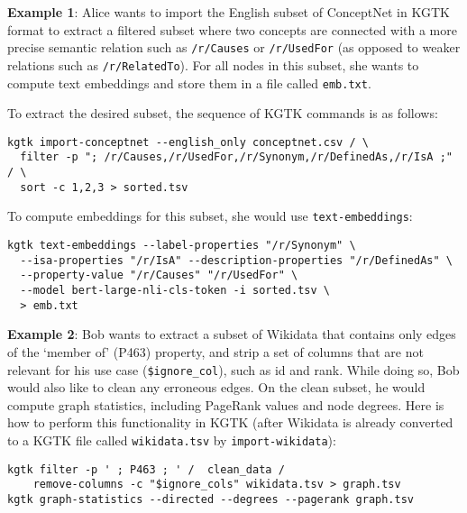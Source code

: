\documentclass[runningheads]{llncs}
\begin{document}



\textbf{Example 1}: Alice wants to import the English subset of ConceptNet \cite{speer2016conceptnet} in KGTK format to extract a filtered subset where two concepts are connected with a more precise semantic relation such as \texttt{/r/Causes} or \texttt{/r/UsedFor} (as opposed to weaker relations such as \texttt{/r/RelatedTo}). For all nodes in this subset, she wants to compute text embeddings and store them in a file called \texttt{emb.txt}.

To extract the desired subset, the sequence of KGTK commands is as follows:
{\footnotesize
\begin{verbatim}
kgtk import-conceptnet --english_only conceptnet.csv / \
  filter -p "; /r/Causes,/r/UsedFor,/r/Synonym,/r/DefinedAs,/r/IsA ;" / \
  sort -c 1,2,3 > sorted.tsv
\end{verbatim}
}

To compute embeddings for this subset, she would use \texttt{text-embeddings}:
{\footnotesize
\begin{verbatim}
kgtk text-embeddings --label-properties "/r/Synonym" \
  --isa-properties "/r/IsA" --description-properties "/r/DefinedAs" \
  --property-value "/r/Causes" "/r/UsedFor" \ 
  --model bert-large-nli-cls-token -i sorted.tsv \
  > emb.txt
\end{verbatim}
}


\textbf{Example 2}: Bob wants to extract a subset of Wikidata that contains only edges of the `member of' (P463) property, and strip a set of columns that are not relevant for his use case (\texttt{\$ignore\_col}), such as id and rank. While doing so, Bob would also like to clean any erroneous edges. On the clean subset, he would compute graph statistics, including PageRank values and node degrees. Here is how to perform this functionality in KGTK (after Wikidata is already converted to a KGTK file called \texttt{wikidata.tsv} by \texttt{import-wikidata}):
{\footnotesize
\begin{verbatim}
kgtk filter -p ' ; P463 ; ' /  clean_data / 
    remove-columns -c "$ignore_cols" wikidata.tsv > graph.tsv
kgtk graph-statistics --directed --degrees --pagerank graph.tsv
\end{verbatim}
}
\end{document}
